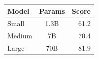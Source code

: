 \documentclass[border=10pt,12pt]{standalone}
\begin{document}
\begin{tabular}{|l|c|r|}
  \hline
  Model & Params & Score \\
  \hline
  Small & 1.3B & 61.2 \\
  Medium & 7B & 70.4 \\
  Large & 70B & 81.9 \\
  \hline
\end{tabular}
\end{document}
